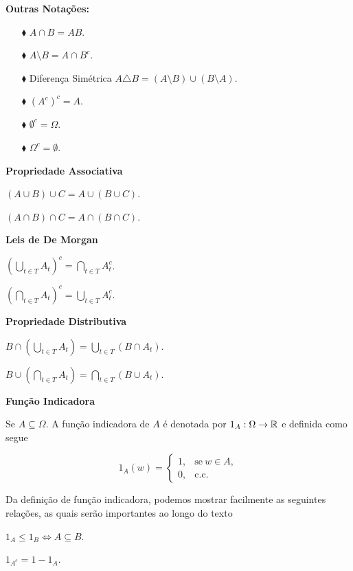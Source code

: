 \textbf{Outras Notações:}

\begin{enumerate}
\item[$\blacklozenge$] $ A \cap B = AB$.
\item[$\blacklozenge$] $A \setminus B = A \cap B^c$.
\item[$\blacklozenge$] Diferença Simétrica $A\triangle B = (A \setminus B) \cup (B\setminus A).$
\item[$\blacklozenge$] $(A^c)^c = A $.
\item[$\blacklozenge$] $\emptyset^c = \Omega$.
\item[$\blacklozenge$] $\Omega^c = \emptyset$.
\end{enumerate}

\textbf{Propriedade Associativa}

$(A\cup B)\cup C= A \cup ( B \cup C)$.

$(A\cap B)\cap C= A \cap ( B \cap C)$.

\vspace*{1cm}
\textbf{Leis de De Morgan}

$\left( \displaystyle\bigcup_{t \in T}{A_t} \right)^c = \displaystyle\bigcap_{t \in T}{A_t^c}$.

$\left( \displaystyle\bigcap_{t \in T}{A_t} \right)^c = \displaystyle\bigcup_{t \in T}{A_t^c}$.


\vspace*{1cm}
\textbf{Propriedade Distributiva}

$B \cap \left( \displaystyle\bigcup_{t \in T}{A_t} \right) = \displaystyle\bigcup_{t \in T}{(B\cap A_t)} $.

$B \cup \left( \displaystyle\bigcap_{t \in T}{A_t} \right) = \displaystyle\bigcap_{t \in T}{(B\cup A_t)} $.

\vspace*{1cm}
\textbf{Função Indicadora}

Se $A \subseteq \Omega$. A função indicadora de $A$ é denotada por $1_A: \Omega \to \mathbb{R}$ e definida 
como segue

$$
	1_A(w) =
	\begin{cases}
		1, & \text{se}\ w \in A, \\
		0, & \text{c.c.}
	\end{cases}
$$

\begin{observacao} Da definição de função indicadora, podemos mostrar facilmente 
as seguintes relações,
as quais serão importantes ao longo do texto

$1_A \leqslant 1_B \Leftrightarrow A \subseteq B$.

$1_{A^c}= 1- 1_A$.
\end{observacao}


